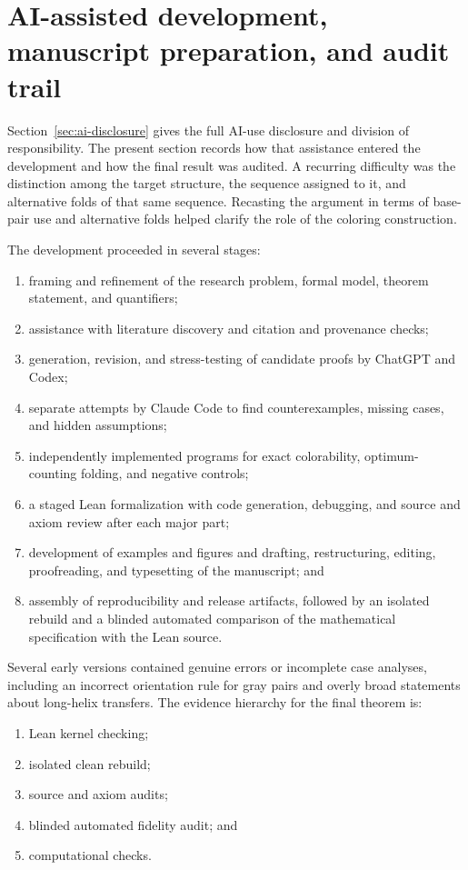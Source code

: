 \documentclass[11pt]{article}
\begin{document}
\section{AI-assisted development, manuscript preparation, and audit trail}
\label{sec:ai}

Section~\ref{sec:ai-disclosure} gives the full AI-use disclosure and division of responsibility.  The present section records how that assistance entered the development and how the final result was audited.  A recurring difficulty was the distinction among the target structure, the sequence assigned to it, and alternative folds of that same sequence.  Recasting the argument in terms of base-pair use and alternative folds helped clarify the role of the coloring construction.

The development proceeded in several stages:
\begin{enumerate}
\item framing and refinement of the research problem, formal model, theorem statement, and quantifiers;
\item assistance with literature discovery and citation and provenance checks;
\item generation, revision, and stress-testing of candidate proofs by ChatGPT and Codex;
\item separate attempts by Claude Code to find counterexamples, missing cases, and hidden assumptions;
\item independently implemented programs for exact colorability, optimum-counting folding, and negative controls;
\item a staged Lean formalization with code generation, debugging, and source and axiom review after each major part;
\item development of examples and figures and drafting, restructuring, editing, proofreading, and typesetting of the manuscript; and
\item assembly of reproducibility and release artifacts, followed by an isolated rebuild and a blinded automated comparison of the mathematical specification with the Lean source.
\end{enumerate}

Several early versions contained genuine errors or incomplete case analyses, including an incorrect orientation rule for gray pairs and overly broad statements about long-helix transfers.  The evidence hierarchy for the final theorem is:
\begin{enumerate}
\item Lean kernel checking;
\item isolated clean rebuild;
\item source and axiom audits;
\item blinded automated fidelity audit; and
\item computational checks.
\end{enumerate}
\end{document}
